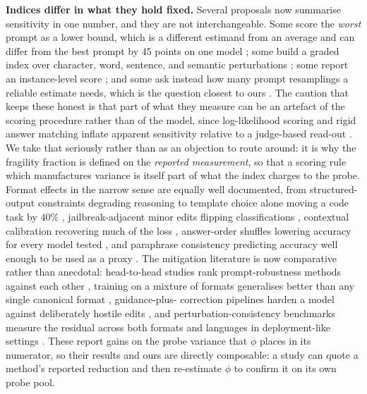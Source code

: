 \documentclass[11pt]{article}
\begin{document}
\textbf{Indices differ in what they hold fixed.} Several proposals now
summarise sensitivity in one number, and they are not interchangeable. Some
score the \emph{worst} prompt as a lower bound, which is a different estimand
from an average and can differ from the best prompt by $45$ points on one model
\cite{cao2024worst}; some build a graded index over character, word, sentence,
and semantic perturbations \cite{zhu2024promptrobust}; some report an
instance-level score \cite{zhuo2024prosa}; and some ask instead how many prompt
resamplings a reliable estimate needs, which is the question closest to ours
\cite{lior2025reliableeval,razavi2025promptset}. The caution that keeps these
honest is that part of what they measure can be an artefact of the scoring
procedure rather than of the model, since log-likelihood scoring and rigid
answer matching inflate apparent sensitivity relative to a judge-based read-out
\cite{hua2025flaw}. We take that seriously rather than as an objection to
route around: it is why the fragility fraction is defined on the
\emph{reported measurement}, so that a scoring rule which manufactures
variance is itself part of what the index charges to the probe. Format effects
in the narrow sense are equally well documented, from structured-output
constraints degrading reasoning \cite{tam2024format} to template choice alone
moving a code task by $40\%$ \cite{he2024formatting}, jailbreak-adjacent
minor edits flipping classifications \cite{salinas2024butterfly}, contextual
calibration recovering much of the loss \cite{zhao2021calibrate}, answer-order
shuffles lowering accuracy for every model tested
\cite{gupta2024answerorder}, and paraphrase consistency predicting accuracy
well enough to be used as a proxy \cite{rabinovich2023semconsistency}. The
mitigation literature is now comparative rather than anecdotal: head-to-head
studies rank prompt-robustness methods against each other
\cite{seleznyov2025punctuation}, training on a mixture of formats generalises
better than any single canonical format \cite{ngweta2025mof}, guidance-plus-
correction pipelines harden a model against deliberately hostile edits
\cite{mu2025rop}, and perturbation-consistency benchmarks measure the residual
across both formats and languages in deployment-like settings
\cite{bogavelli2026enterprise}. These report gains on the probe variance that
$\phi$ places in its numerator, so their results and ours are directly
composable: a study can quote a method's reported reduction and then re-estimate
$\phi$ to confirm it on its own probe pool.
\end{document}
